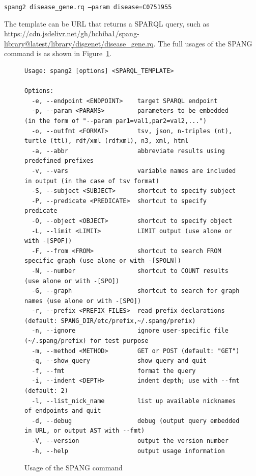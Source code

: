 \documentclass[runningheads]{llncs}
\begin{document}
\texttt{spang2 disease\_gene.rq --param disease=C0751955}

The template can be URL that returns a SPARQL query, such as \url{https://cdn.jsdelivr.net/gh/hchiba1/spang-library@latest/library/disgenet/disease_gene.rq}. The full usages of the SPANG command is as shown in Figure~\ref{fig:spang-command}.


\begin{figure}[!t]
\begin{scriptsize}
\begin{verbatim}
Usage: spang2 [options] <SPARQL_TEMPLATE>

Options:
  -e, --endpoint <ENDPOINT>    target SPARQL endpoint
  -p, --param <PARAMS>         parameters to be embedded (in the form of "--param par1=val1,par2=val2,...")
  -o, --outfmt <FORMAT>        tsv, json, n-triples (nt), turtle (ttl), rdf/xml (rdfxml), n3, xml, html
  -a, --abbr                   abbreviate results using predefined prefixes
  -v, --vars                   variable names are included in output (in the case of tsv format)
  -S, --subject <SUBJECT>      shortcut to specify subject
  -P, --predicate <PREDICATE>  shortcut to specify predicate
  -O, --object <OBJECT>        shortcut to specify object
  -L, --limit <LIMIT>          LIMIT output (use alone or with -[SPOF])
  -F, --from <FROM>            shortcut to search FROM specific graph (use alone or with -[SPOLN])
  -N, --number                 shortcut to COUNT results (use alone or with -[SPO])
  -G, --graph                  shortcut to search for graph names (use alone or with -[SPO])
  -r, --prefix <PREFIX_FILES>  read prefix declarations (default: SPANG_DIR/etc/prefix,~/.spang/prefix)
  -n, --ignore                 ignore user-specific file (~/.spang/prefix) for test purpose
  -m, --method <METHOD>        GET or POST (default: "GET")
  -q, --show_query             show query and quit
  -f, --fmt                    format the query
  -i, --indent <DEPTH>         indent depth; use with --fmt (default: 2)
  -l, --list_nick_name         list up available nicknames of endpoints and quit
  -d, --debug                  debug (output query embedded in URL, or output AST with --fmt)
  -V, --version                output the version number
  -h, --help                   output usage information

\end{verbatim}
\end{scriptsize}
\caption{Usage of the SPANG command}
\label{fig:spang-command}
\end{figure}
\end{document}
